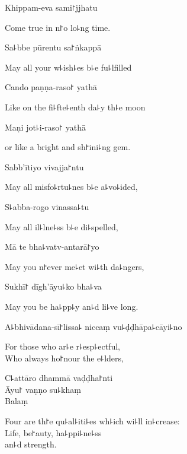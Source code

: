 Khippam-eva sami꜓jjhatu

\begin{english}
  Come true in n꜓o lo꜕ng time.
\end{english}

Sa꜕bbe pūrentu sa꜓ṅkappā

\begin{english}
  May all your w꜕ish꜕es b꜕e fu꜕lfilled
\end{english}

Cando paṇṇa-raso꜓ yathā

\begin{english}
  Like on the fi꜕fte꜕enth da꜕y th꜕e moon
\end{english}

Maṇi jot꜕i-raso꜓ yathā

\begin{english}
  or like a bright and sh꜓ini꜕ng gem.
\end{english}

Sabb'ītiyo vivajja꜓ntu

\begin{english}
  May all misfo꜕rtu꜕nes b꜕e a꜕vo꜕ided,
\end{english}

S꜕abba-rogo vinassa꜕tu

\begin{english}
  May all il꜕lne꜕ss b꜕e di꜕spelled,
\end{english}

Mā te bha꜕vatv-antarā꜓yo

\begin{english}
  May you n꜓ever me꜕et wi꜕th da꜕ngers,
\end{english}

Sukhī꜓ dīgh'āyu꜕ko bha꜕va

\begin{english}
  May you be ha꜕pp꜕y an꜕d li꜕ve long.
\end{english}

A꜕bhivādana-sī꜓lissa꜕ niccaṃ vu꜕ḍḍhāpa꜕cāyi꜕no\\

\begin{english}
  For those who ar꜕e r꜕esp꜕ectful,\\
  Who always ho꜓nour the e꜕lders,
\end{english}

C꜕attāro dhammā vaḍḍha꜓nti\\
Āyu꜓ vaṇṇo su꜕khaṃ\\
Balaṃ

\begin{english}
  Four are th꜓e qu꜕al꜕iti꜕es wh꜕ich wi꜕ll in꜕crease:\\
  Life, be꜓auty, ha꜕ppi꜕ne꜕ss\\
  an꜕d strength.
\end{english}

